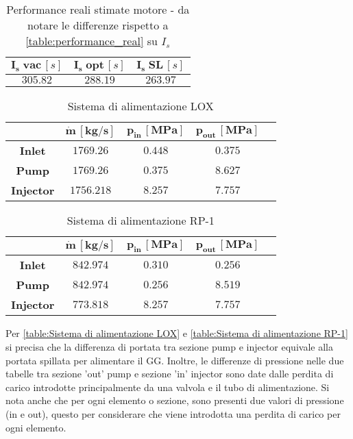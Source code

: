 \begin{table}[H]
\centering
\begin{tabular}{|c|c|c|}
\hline
$\bm{I_s \; vac} \, [s]$ & $\bm{I_s \; opt} \, [s]$ & $\bm{I_s \; SL} \, [s]$ \\
\hline
$305.82$ & $288.19$ & $263.97$ \\
\hline
\end{tabular}
\caption{Performance reali stimate motore - da notare le differenze rispetto a \autoref{table:performance_real} su $I_s$}
\label{table:performance_eng_real}
\end{table}



\vspace{10pt}

\begin{table}[H]
\centering
\begin{tabular}{|c|c|c|c|c|}
\hline
& $\bm{\dot{m} \, [kg/s]}$ & $\bm{p_{in} \, [MPa]}$ & $\bm{p_{out} \, [MPa]}$ \\
\hline
\textbf{Inlet} & $1769.26$ & $0.448$ & $0.375$ \\
\hline
\textbf{Pump} & $1769.26$ & $0.375$ & $8.627$ \\
\hline
\textbf{Injector} & $1756.218$ & $8.257$ & $7.757$ \\
\hline
\end{tabular}
\caption{Sistema di alimentazione LOX}
\label{table:Sistema di alimentazione LOX}
\end{table}

\begin{table}[H]
\centering
\begin{tabular}{|c|c|c|c|c|}
\hline
& $\bm{\dot{m} \, [kg/s]}$ & $\bm{p_{in} \, [MPa]}$ & $\bm{p_{out} \, [MPa]}$ \\
\hline
\textbf{Inlet} & $842.974$ & $0.310$ & $0.256$ \\
\hline
\textbf{Pump} & $842.974$ & $0.256$ & $8.519$ \\
\hline
\textbf{Injector} & $773.818$ & $8.257$ & $7.757$ \\
\hline
\end{tabular}
\caption{Sistema di alimentazione RP-1}
\label{table:Sistema di alimentazione RP-1}
\end{table}
Per \autoref{table:Sistema di alimentazione LOX} e \autoref{table:Sistema di alimentazione RP-1} si precisa che la differenza di portata tra sezione pump e injector equivale alla portata spillata per alimentare il GG. Inoltre, le differenze di pressione nelle due tabelle tra sezione 'out' pump e sezione 'in' injector sono date dalle perdita di carico introdotte principalmente da una valvola e il tubo di alimentazione. Si nota anche che per ogni elemento o sezione, sono presenti due valori di pressione (in e out), questo per considerare che viene introdotta una perdita di carico per ogni elemento.

